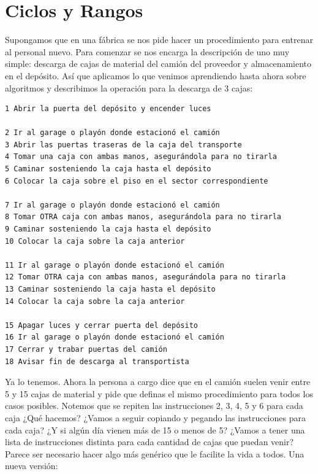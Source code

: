\documentclass[
  letterpaper,
  DIV=11,
  numbers=noendperiod]{scrreprt}
\begin{document}
\section{Ciclos y Rangos}\label{ciclos-y-rangos}

Supongamos que en una fábrica se nos pide hacer un procedimiento para
entrenar al personal nuevo. Para comenzar se nos encarga la descripción
de uno muy simple: descarga de cajas de material del camión del
proveedor y almacenamiento en el depósito. Así que aplicamos lo que
venimos aprendiendo hasta ahora sobre algoritmos y describimos la
operación para la descarga de 3 cajas:

\begin{verbatim}
1 Abrir la puerta del depósito y encender luces 

2 Ir al garage o playón donde estacionó el camión 
3 Abrir las puertas traseras de la caja del transporte
4 Tomar una caja con ambas manos, asegurándola para no tirarla 
5 Caminar sosteniendo la caja hasta el depósito 
6 Colocar la caja sobre el piso en el sector correspondiente

7 Ir al garage o playón donde estacionó el camión
8 Tomar OTRA caja con ambas manos, asegurándola para no tirarla 
9 Caminar sosteniendo la caja hasta el depósito 
10 Colocar la caja sobre la caja anterior 

11 Ir al garage o playón donde estacionó el camión
12 Tomar OTRA caja con ambas manos, asegurándola para no tirarla 
13 Caminar sosteniendo la caja hasta el depósito 
14 Colocar la caja sobre la caja anterior

15 Apagar luces y cerrar puerta del depósito 
16 Ir al garage o playón donde estacionó el camión 
17 Cerrar y trabar puertas del camión 
18 Avisar fin de descarga al transportista
\end{verbatim}

Ya lo tenemos. Ahora la persona a cargo dice que en el camión suelen
venir entre 5 y 15 cajas de material y pide que definas el mismo
procedimiento para todos los casos posibles. Notemos que se repiten las
instrucciones 2, 3, 4, 5 y 6 para cada caja ¿Qué hacemos? ¿Vamos a
seguir copiando y pegando las instrucciones para cada caja? ¿Y si algún
día vienen más de 15 o menos de 5? ¿Vamos a tener una lista de
instrucciones distinta para cada cantidad de cajas que puedan venir?
Parece ser necesario hacer algo más genérico que le facilite la vida a
todos. Una nueva versión:
\end{document}
